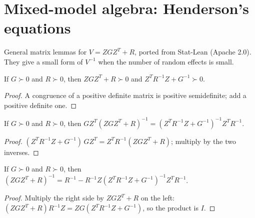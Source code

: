 \section{Mixed-model algebra: Henderson's equations}

General matrix lemmas for $V = ZGZ^T + R$, ported from Stat-Lean (Apache 2.0). They give a small
form of $V^{-1}$ when the number of random effects is small.

\begin{lemma}\label{lem:mme_posDef}
  \leanok
  If $G \succ 0$ and $R \succ 0$, then $ZGZ^T + R \succ 0$ and $Z^TR^{-1}Z + G^{-1} \succ 0$.
\end{lemma}
\begin{proof}
  \leanok
  A congruence of a positive definite matrix is positive semidefinite; add a positive definite one.
\end{proof}

\begin{theorem}\label{thm:pushThrough}
  \leanok
  If $G \succ 0$ and $R \succ 0$, then
  $GZ^T(ZGZ^T + R)^{-1} = (Z^TR^{-1}Z + G^{-1})^{-1}Z^TR^{-1}$.
\end{theorem}
\begin{proof}
  \leanok
  $(Z^TR^{-1}Z + G^{-1})\,GZ^T = Z^TR^{-1}(ZGZ^T + R)$; multiply by the two inverses.
\end{proof}

\begin{theorem}\label{thm:inv_mul_mul_transpose_add}
  \leanok
  If $G \succ 0$ and $R \succ 0$, then
  $(ZGZ^T + R)^{-1} = R^{-1} - R^{-1}Z(Z^TR^{-1}Z + G^{-1})^{-1}Z^TR^{-1}$.
\end{theorem}
\begin{proof}
  \leanok
  Multiply the right side by $ZGZ^T + R$ on the left: $(ZGZ^T + R)R^{-1}Z = ZG(Z^TR^{-1}Z + G^{-1})$,
  so the product is $I$.
\end{proof}

